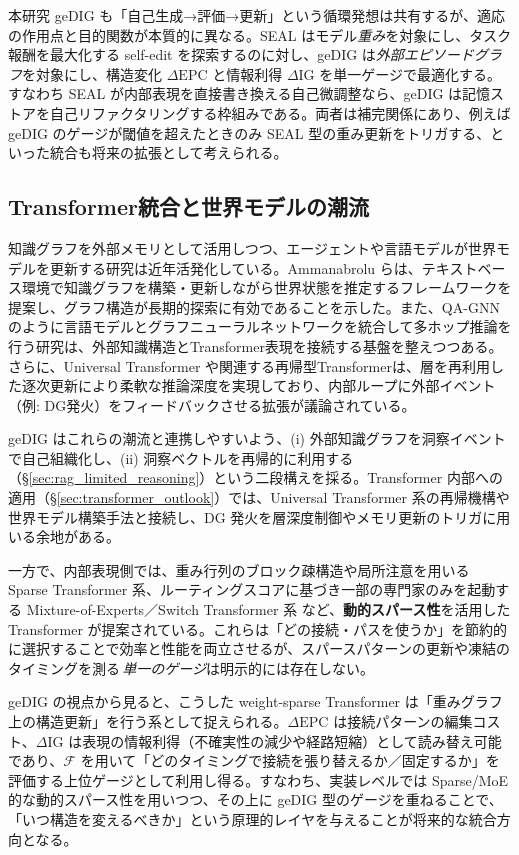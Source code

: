 \documentclass[ja=standard,xelatex]{bxjsarticle}
\newcommand{\F}{\mathcal{F}}
\begin{document}
本研究 geDIG も「自己生成→評価→更新」という循環発想は共有するが、適応の作用点と目的関数が本質的に異なる。SEAL はモデル\emph{重み}を対象にし、タスク報酬を最大化する self-edit を探索するのに対し、geDIG は\emph{外部エピソードグラフ}を対象にし、構造変化 $\Delta\mathrm{EPC}$ と情報利得 $\Delta\mathrm{IG}$ を単一ゲージで最適化する。すなわち SEAL が内部表現を直接書き換える自己微調整なら、geDIG は記憶ストアを自己リファクタリングする枠組みである。両者は補完関係にあり、例えば geDIG のゲージが閾値を超えたときのみ SEAL 型の重み更新をトリガする、といった統合も将来の拡張として考えられる。

\subsection{Transformer統合と世界モデルの潮流}

知識グラフを外部メモリとして活用しつつ、エージェントや言語モデルが世界モデルを更新する研究は近年活発化している。Ammanabrolu ら\cite{Ammanabrolu2020WorldModels}は、テキストベース環境で知識グラフを構築・更新しながら世界状態を推定するフレームワークを提案し、グラフ構造が長期的探索に有効であることを示した。また、QA-GNN\cite{Yasunaga2021QAGNN}のように言語モデルとグラフニューラルネットワークを統合して多ホップ推論を行う研究は、外部知識構造とTransformer表現を接続する基盤を整えつつある。さらに、Universal Transformer\cite{Dehghani2019UniversalTransformer} や関連する再帰型Transformerは、層を再利用した逐次更新により柔軟な推論深度を実現しており、内部ループに外部イベント（例: DG発火）をフィードバックさせる拡張が議論されている。

geDIG はこれらの潮流と連携しやすいよう、(i) 外部知識グラフを洞察イベントで自己組織化し、(ii) 洞察ベクトルを再帰的に利用する（\S\ref{sec:rag_limited_reasoning}）という二段構えを採る。Transformer 内部への適用（\S\ref{sec:transformer_outlook}）では、Universal Transformer 系の再帰機構や世界モデル構築手法と接続し、DG 発火を層深度制御やメモリ更新のトリガに用いる余地がある。

一方で、内部表現側では、重み行列のブロック疎構造や局所注意を用いる Sparse Transformer 系\cite{Child2019SparseTransformer}、ルーティングスコアに基づき一部の専門家のみを起動する Mixture-of-Experts／Switch Transformer 系\cite{Fedus2021SwitchTransformer} など、\textbf{動的スパース性}を活用した Transformer が提案されている。これらは「どの接続・パスを使うか」を節約的に選択することで効率と性能を両立させるが、スパースパターンの更新や凍結のタイミングを測る\,\emph{単一のゲージ}は明示的には存在しない。

geDIG の視点から見ると、こうした weight-sparse Transformer は「重みグラフ上の構造更新」を行う系として捉えられる。$\Delta\mathrm{EPC}$ は接続パターンの編集コスト、$\Delta\mathrm{IG}$ は表現の情報利得（不確実性の減少や経路短縮）として読み替え可能であり、$\F$ を用いて「どのタイミングで接続を張り替えるか／固定するか」を評価する上位ゲージとして利用し得る。すなわち、実装レベルでは Sparse/MoE 的な動的スパース性を用いつつ、その上に geDIG 型のゲージを重ねることで、「いつ構造を変えるべきか」という原理的レイヤを与えることが将来的な統合方向となる。
\end{document}
